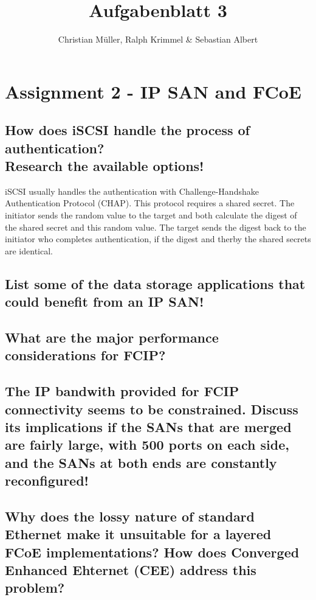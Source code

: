 \documentclass{article}
\title{Aufgabenblatt 3}
\author{Christian Müller, Ralph Krimmel \& Sebastian Albert }
\begin{document}
\maketitle

\section*{Assignment 2 - IP SAN and FCoE}

\subsection{How does iSCSI handle the process of authentication?\\Research the available options!}
	iSCSI usually handles the authentication with Challenge-Handshake Authentication Protocol (CHAP).
	This protocol requires a shared secret.
	The initiator sends the random value to the target 
	and both calculate the digest of the shared secret and this random value.
	The target sends the digest back to the initiator who completes authentication,
	if the digest and therby the shared secrets are identical.

\subsection{List some of the data storage applications that could benefit from an IP SAN!}

\subsection{What are the major performance considerations for FCIP?}

\subsection{The IP bandwith provided for FCIP connectivity seems to be constrained.
	Discuss its implications if the SANs that are merged are fairly large,
	with 500 ports on each side, and the SANs at both ends are constantly reconfigured!}

\subsection{Why does the lossy nature of standard Ethernet make it unsuitable for a layered FCoE implementations?
	How does Converged Enhanced Ehternet (CEE) address this problem?}
\end{document}
